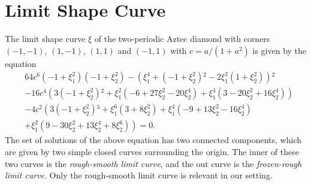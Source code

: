 \documentclass[11pt,twoside]{amsart}
\theoremstyle{plain}
\numberwithin{quest}{section}
\theoremstyle{remark}
\numberwithin{rem}{section}
\theoremstyle{definition}
\begin{document}
	\begin{appendix}
		\label{A:limit-shape-curve}
		
		
		\section{Limit Shape Curve}
		
		The limit shape curve $\xi$ of the two-periodic Aztec diamond with corners $(-1,-1)$, $(1,-1)$, $(1,1)$ and $(-1,1)$ with $c=a/(1+a^2)$ is given by the equation
		\begin{equation}\label{eq:asymp:limitshape}
			\begin{split} &64 c^6 \left(-1+\xi _1^2\right) \left(-1+\xi _2^2\right)-\left(\xi _1^4+\left(-1+\xi _2^2\right){}^2-2 \xi _1^2 \left(1+\xi _2^2\right)\right){}^2\\ &
				-16 c^4 \left(3 \left(-1+\xi _2^2\right){}^2+\xi _1^2 \left(-6+27 \xi _2^2-20 \xi _2^4\right)+\xi _1^4 \left(3-20 \xi _2^2+16 \xi _2^4\right)\right) \\
				&
				-4 c^2 \left(3 \left(-1+\xi _2^2\right){}^3+\xi _1^6 \left(3+8 \xi _2^2\right)+\xi _1^4 \left(-9+13 \xi _2^2-16 \xi _2^4\right)\right. \\
				&\left.+\xi _1^2 \left(9-30 \xi _2^2+13 \xi _2^4+8 \xi _2^6\right)\right) =0.
			\end{split}
		\end{equation}
		The set of solutions of the above equation has two connected components, which are given by two simple closed curves surrounding the origin. The inner of these two curves is the \textit{rough-smooth limit curve}, and the out curve is the \textit{frozen-rough limit curve}. Only the rough-smooth limit curve is relevant in our setting.
		
		

\end{appendix}
\end{document}
